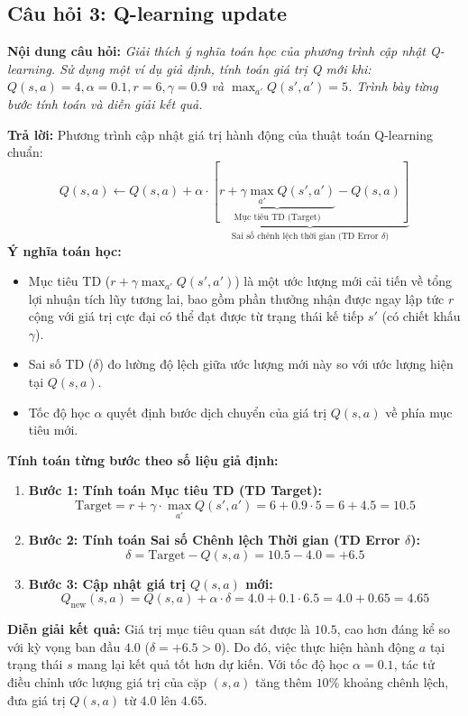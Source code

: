 \documentclass[12pt,a4paper]{article}
\begin{document}
\subsection{Câu hỏi 3: Q-learning update}
\textbf{Nội dung câu hỏi:} \textit{Giải thích ý nghĩa toán học của phương trình cập nhật Q-learning. Sử dụng một ví dụ giả định, tính toán giá trị Q mới khi: $Q(s, a) = 4, \alpha = 0.1, r = 6, \gamma = 0.9$ và $\max_{a'} Q(s', a') = 5$. Trình bày từng bước tính toán và diễn giải kết quả.}

\textbf{Trả lời:}
Phương trình cập nhật giá trị hành động của thuật toán Q-learning chuẩn:
\begin{equation}
Q(s, a) \leftarrow Q(s, a) + \alpha \cdot \underbrace{\left[ \underbrace{r + \gamma \max_{a'} Q(s', a')}_{\text{Mục tiêu TD (Target)}} - Q(s, a) \right]}_{\text{Sai số chênh lệch thời gian (TD Error } \delta)}
\end{equation}
\textbf{Ý nghĩa toán học:}
\begin{itemize}
    \item Mục tiêu TD ($r + \gamma \max_{a'} Q(s', a')$) là một ước lượng mới cải tiến về tổng lợi nhuận tích lũy tương lai, bao gồm phần thưởng nhận được ngay lập tức $r$ cộng với giá trị cực đại có thể đạt được từ trạng thái kế tiếp $s'$ (có chiết khấu $\gamma$).
    \item Sai số TD ($\delta$) đo lường độ lệch giữa ước lượng mới này so với ước lượng hiện tại $Q(s, a)$.
    \item Tốc độ học $\alpha$ quyết định bước dịch chuyển của giá trị $Q(s, a)$ về phía mục tiêu mới.
\end{itemize}

\noindent \textbf{Tính toán từng bước theo số liệu giả định:}
\begin{enumerate}
    \item \textbf{Bước 1: Tính toán Mục tiêu TD (TD Target):}
    \begin{equation}
    \text{Target} = r + \gamma \cdot \max_{a'} Q(s', a') = 6 + 0.9 \cdot 5 = 6 + 4.5 = 10.5
    \end{equation}
    \item \textbf{Bước 2: Tính toán Sai số Chênh lệch Thời gian (TD Error $\delta$):}
    \begin{equation}
    \delta = \text{Target} - Q(s, a) = 10.5 - 4.0 = +6.5
    \end{equation}
    \item \textbf{Bước 3: Cập nhật giá trị $Q(s, a)$ mới:}
    \begin{equation}
    Q_{\text{new}}(s, a) = Q(s, a) + \alpha \cdot \delta = 4.0 + 0.1 \cdot 6.5 = 4.0 + 0.65 = \mathbf{4.65}
    \end{equation}
\end{enumerate}
\textbf{Diễn giải kết quả:} Giá trị mục tiêu quan sát được là $10.5$, cao hơn đáng kể so với kỳ vọng ban đầu $4.0$ ($\delta = +6.5 > 0$). Do đó, việc thực hiện hành động $a$ tại trạng thái $s$ mang lại kết quả tốt hơn dự kiến. Với tốc độ học $\alpha = 0.1$, tác tử điều chỉnh ước lượng giá trị của cặp $(s, a)$ tăng thêm $10\%$ khoảng chênh lệch, đưa giá trị $Q(s, a)$ từ $4.0$ lên $4.65$.
\end{document}
